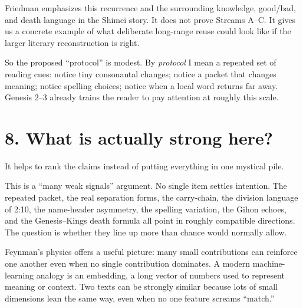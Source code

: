 Friedman emphasizes this recurrence and the surrounding knowledge, good/bad, and death language in the Shimei story.\cite{Friedman1998} It does not prove Streams A--C. It gives us a concrete example of what deliberate long-range reuse could look like if the larger literary reconstruction is right.

So the proposed ``protocol'' is modest. By \emph{protocol} I mean a repeated set of reading cues: notice tiny consonantal changes; notice a packet that changes meaning; notice spelling choices; notice when a local word returns far away. Genesis 2--3 already trains the reader to pay attention at roughly this scale.

\section*{8. What is actually strong here?}

It helps to rank the claims instead of putting everything in one mystical pile.


This is a ``many weak signals'' argument. No single item settles intention. The repeated  packet, the real separation forms, the carry-chain, the division language of 2:10, the name-header asymmetry, the spelling variation, the Gihon echoes, and the Genesis--Kings death formula all point in roughly compatible directions. The question is whether they line up more than chance would normally allow.

Feynman's physics offers a useful picture: many small contributions can reinforce one another even when no single contribution dominates.\cite{FeynmanHibbs1965} A modern machine-learning analogy is an embedding, a long vector of numbers used to represent meaning or context. Two texts can be strongly similar because lots of small dimensions lean the same way, even when no one feature screams ``match.''

